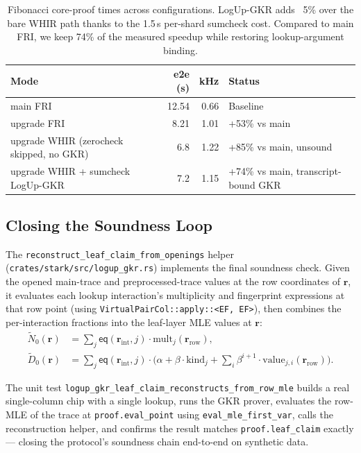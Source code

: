 \begin{table}[h]
\centering
\begin{tabular}{lrrl}
\toprule
\textbf{Mode} & \textbf{e2e (s)} & \textbf{kHz} & \textbf{Status} \\
\midrule
main FRI            & 12.54 & 0.66 & Baseline \\
upgrade FRI         & 8.21  & 1.01 & +53\% vs main \\
upgrade WHIR (zerocheck skipped, no GKR) & 6.8  & 1.22 & +85\% vs main, unsound \\
upgrade WHIR + sumcheck LogUp-GKR        & 7.2  & 1.15 & +74\% vs main, transcript-bound GKR \\
\bottomrule
\end{tabular}
\caption{Fibonacci core-proof times across configurations. LogUp-GKR
adds ~5\% over the bare WHIR path thanks to the 1.5\,s per-shard sumcheck
cost. Compared to main FRI, we keep 74\% of the measured speedup while
restoring lookup-argument binding.}
\label{tab:logup-gkr-perf}
\end{table}

\subsection{Closing the Soundness Loop}

The \texttt{reconstruct\_leaf\_claim\_from\_openings} helper
(\texttt{crates/stark/src/logup\_gkr.rs}) implements the final soundness
check.  Given the opened main-trace and preprocessed-trace values at the
row coordinates of $\mathbf{r}$, it evaluates each lookup interaction's
multiplicity and fingerprint expressions at that row point (using
\texttt{VirtualPairCol::apply::<EF, EF>}), then combines the
per-interaction fractions into the leaf-layer MLE values at
$\mathbf{r}$:
\begin{align*}
  \widetilde{N}_0(\mathbf{r})
    &= \sum_{j} \mathsf{eq}(\mathbf{r}_{\mathrm{int}}, j) \cdot \mathrm{mult}_j(\mathbf{r}_{\mathrm{row}}), \\
  \widetilde{D}_0(\mathbf{r})
    &= \sum_{j} \mathsf{eq}(\mathbf{r}_{\mathrm{int}}, j) \cdot \bigl(\alpha + \beta \cdot \mathrm{kind}_j + \textstyle\sum_i \beta^{i+1} \cdot \mathrm{value}_{j,i}(\mathbf{r}_{\mathrm{row}})\bigr).
\end{align*}

The unit test \texttt{logup\_gkr\_leaf\_claim\_reconstructs\_from\_row\_mle}
builds a real single-column chip with a single lookup, runs the GKR
prover, evaluates the row-MLE of the trace at \texttt{proof.eval\_point}
using \texttt{eval\_mle\_first\_var}, calls the reconstruction helper,
and confirms the result matches \texttt{proof.leaf\_claim} exactly ---
closing the protocol's soundness chain end-to-end on synthetic data.

